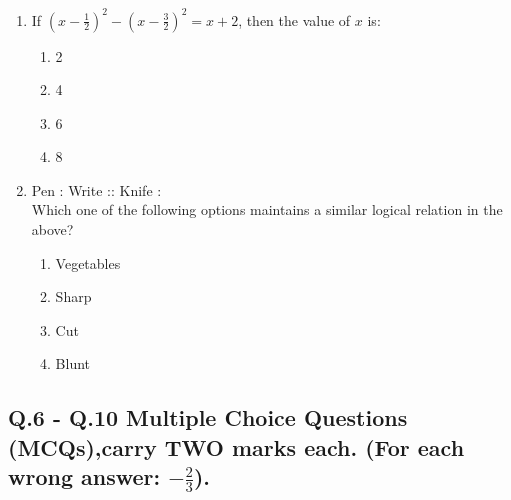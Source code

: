 \documentclass[journal,12pt,onecolumn]{IEEEtran}
\theoremstyle{remark}
\begin{document}
\begin{enumerate}
    \item If $(x- \frac{1}{2})^2-(x- \frac{3}{2})^2=x+2$, then the value of $x$ is:
    \begin{enumerate}
        \item 2
        \item 4
        \item 6
        \item 8
    \end{enumerate}
    
    \item Pen : Write :: Knife : {\underline{\hspace{2cm}}}\\
    Which one of the following options maintains a similar logical relation in the above?
    \begin{enumerate}
        \item Vegetables
        \item Sharp
        \item Cut
        \item Blunt
    \end{enumerate}
\end{enumerate}

\subsection*{Q.6 - Q.10 Multiple Choice Questions (MCQs),carry \textbf{TWO} marks each. (For each wrong answer: $-\frac{2}{3}$).
}
\end{document}
